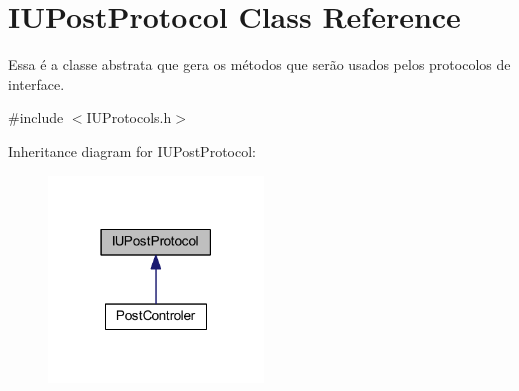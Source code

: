\hypertarget{class_i_u_post_protocol}{\section{I\-U\-Post\-Protocol Class Reference}
\label{class_i_u_post_protocol}
}


Essa é a classe abstrata que gera os métodos que serão usados pelos protocolos de interface.  




{\ttfamily \#include $<$I\-U\-Protocols.\-h$>$}



Inheritance diagram for I\-U\-Post\-Protocol\-:\nopagebreak
\begin{figure}[H]
\begin{center}
\leavevmode
\includegraphics[width=162pt]{class_i_u_post_protocol__inherit__graph}
\end{center}
\end{figure}
